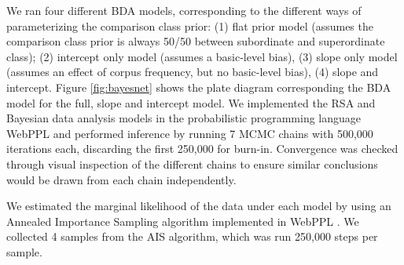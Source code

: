 \documentclass[doc]{apa6}
\begin{document}
We ran four different BDA models, corresponding to the different ways of parameterizing the comparison class prior: (1) flat prior model (assumes the comparison class prior is always 50/50 between subordinate and superordinate class); (2) intercept only model (assumes a basic-level bias), (3) slope only model (assumes an effect of corpus frequency, but no basic-level bias), (4) slope and intercept.
Figure \ref{fig:bayesnet} shows the plate diagram corresponding the BDA model for the full, slope and intercept model. 
We implemented the RSA and Bayesian data analysis models in the probabilistic programming language WebPPL \cite{dippl} and performed inference by running 7 MCMC chains with 500,000 iterations each, discarding the first 250,000 for burn-in. 
Convergence was checked through visual inspection of the different chains to ensure similar conclusions would be drawn from each chain independently. 

We estimated the marginal likelihood of the data under each model by using an Annealed Importance Sampling algorithm implemented in WebPPL \cite{neal2001annealed}. We collected 4 samples from the AIS algorithm, which was run 250,000 steps per sample. 





\end{document}
